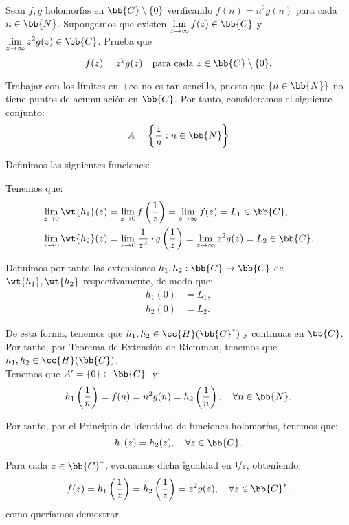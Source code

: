 \documentclass[12pt]{article}
\begin{document}
    \begin{ejercicio}[2.5 puntos]
        Sean $f, g$ holomorfas en $\bb{C} \setminus \{0\}$ verificando $f(n) = n^2 g(n)$ para cada $n \in \bb{N}$. Supongamos que existen $\lim\limits_{z \to \infty} f(z) \in \bb{C}$ y $\lim\limits_{z \to \infty} z^2 g(z) \in \bb{C}$. Prueba que
        \[
            f(z) = z^2 g(z) \quad \text{para cada } z \in \bb{C} \setminus \{0\}.
        \]

        Trabajar con los límites en $+\infty$ no es tan sencillo, puesto que $\{n\in \bb{N}\}$ no tiene puntos de acumulación en $\bb{C}$. Por tanto, consideramos el siguiente conjunto:
        \begin{equation*}
            A=\left\{\dfrac{1}{n} : n \in \bb{N}\right\}
        \end{equation*}

        Definimos las siguientes funciones:

        Tenemos que:
        \begin{align*}
            \lim_{z \to 0} \wt{h_1}(z) &= \lim_{z \to 0} f\left(\frac{1}{z}\right) = \lim_{z \to \infty} f(z) = L_1 \in \bb{C},\\
            \lim_{z \to 0} \wt{h_2}(z) &= \lim_{z \to 0} \dfrac{1}{z^2}\cdot g\left(\frac{1}{z}\right) = \lim_{z \to \infty} z^2 g(z) = L_2 \in \bb{C}.
        \end{align*}

        Definimos por tanto las extensiones $h_1, h_2 : \bb{C} \to \bb{C}$ de $\wt{h_1}, \wt{h_2}$ respectivamente, de modo que:
        \begin{align*}
            h_1(0) &= L_1,\\
            h_2(0) &= L_2.
        \end{align*}

        De esta forma, tenemos que $h_1,h_2\in \cc{H}(\bb{C}^*)$ y continuas en $\bb{C}$. Por tanto, por Teorema de Extensión de Riemman, tenemos que $h_1,h_2\in \cc{H}(\bb{C})$.\\

        Tenemos que $A'=\{0\}\subset \bb{C}$, y:
        \begin{equation*}
            h_1\left(\frac{1}{n}\right) = f(n) = n^2 g(n) = h_2\left(\frac{1}{n}\right), \quad \forall n \in \bb{N}.
        \end{equation*}

        Por tanto, por el Principio de Identidad de funciones holomorfas, tenemos que:
        \begin{equation*}
            h_1(z) = h_2(z), \quad \forall z \in \bb{C}.
        \end{equation*}

        Para cada $z \in \bb{C}^*$, evaluamos dicha igualdad en $\nicefrac{1}{z}$, obteniendo:
        \begin{equation*}
            f(z) = h_1\left(\frac{1}{z}\right) = h_2\left(\frac{1}{z}\right) = z^2g(z), \quad \forall z \in \bb{C}^*.
        \end{equation*}
        como queríamos demostrar.
    \end{ejercicio}
\end{document}
